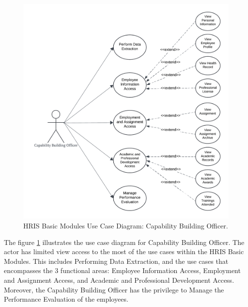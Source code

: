     \begin{figure}[H]
        \centering
        \includegraphics[width=0.9\linewidth]{figures/images/use-case-basic-7.png}
        \caption{HRIS Basic Modules Use Case Diagram: Capability Building Officer.}
        \label{fig:use-case-basic-7}
    \end{figure}

    The figure \ref{fig:use-case-basic-7} illustrates the use case diagram for Capability Building Officer. The actor has limited view access to the most of the use cases within the HRIS Basic Modules. This includes Performing Data Extraction, and the use cases that  encompasses the 3 functional areas: Employee Information Access, Employment and Assignment Access, and Academic and Professional Development Access. Moreover, the Capability Building Officer has the privilege to Manage the Performance Evaluation of the employees.

